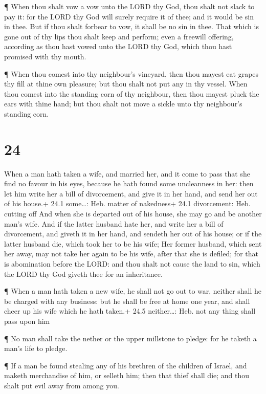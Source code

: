  ¶ When thou shalt vow a vow unto the LORD thy God, thou
shalt not slack to pay it: for the LORD thy God will surely require it
of thee; and it would be sin in thee.  But if thou shalt
forbear to vow, it shall be no sin in thee.  That which is
gone out of thy lips thou shalt keep and perform; even a freewill
offering, according as thou hast vowed unto the LORD thy God, which thou
hast promised with thy mouth.

 ¶ When thou comest into thy neighbour's vineyard, then
thou mayest eat grapes thy fill at thine own pleasure; but thou shalt
not put any in thy vessel.  When thou comest into the
standing corn of thy neighbour, then thou mayest pluck the ears with
thine hand; but thou shalt not move a sickle unto thy neighbour's
standing corn.

\hypertarget{section-23}{%
\section{24}\label{section-23}}

 When a man hath taken a wife, and married her, and it come
to pass that she find no favour in his eyes, because he hath found some
uncleanness in her: then let him write her a bill of divorcement, and
give it in her hand, and send her out of his house.+ 24.1 some\ldots:
Heb. matter of nakedness+ 24.1 divorcement: Heb. cutting off
 And when she is departed out of his house, she may go and
be another man's wife.  And if the latter husband hate her,
and write her a bill of divorcement, and giveth it in her hand, and
sendeth her out of his house; or if the latter husband die, which took
her to be his wife;  Her former husband, which sent her
away, may not take her again to be his wife, after that she is defiled;
for that is abomination before the LORD: and thou shalt not cause the
land to sin, which the LORD thy God giveth thee for an inheritance.

 ¶ When a man hath taken a new wife, he shall not go out to
war, neither shall he be charged with any business: but he shall be free
at home one year, and shall cheer up his wife which he hath taken.+ 24.5
neither\ldots: Heb. not any thing shall pass upon him

 ¶ No man shall take the nether or the upper millstone to
pledge: for he taketh a man's life to pledge.

 ¶ If a man be found stealing any of his brethren of the
children of Israel, and maketh merchandise of him, or selleth him; then
that thief shall die; and thou shalt put evil away from among you.

